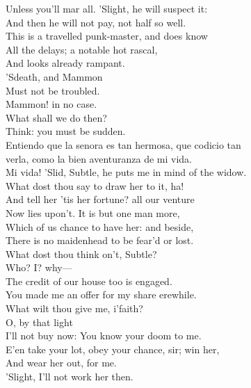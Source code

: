 \documentclass[a4paper,oneside]{memoir}
\begin{document}
\begin{drama*}
\facespeaks Unless you'll mar all. 'Slight, he will suspect it:\\
And then he will not pay, not half so well.\\
This is a travelled punk-master, and does know\\
All the delays; a notable hot rascal,\\
And looks already rampant.\\
\subtlespeaks {} 'Sdeath, and Mammon\\
Must not be troubled.\\
\facespeaks {} Mammon! in no case.\\
\subtlespeaks What shall we do then?\\
\facespeaks {} Think: you must be sudden.\\
\surlyspeaks Entiendo que la senora es tan hermosa, que codicio tan\\
verla, como la bien aventuranza de mi vida.\\
\facespeaks Mi vida! 'Slid, Subtle, he puts me in mind of the widow.\\
What dost thou say to draw her to it, ha!\\
And tell her 'tis her fortune? all our venture\\
Now lies upon't. It is but one man more,\\
Which of us chance to have her: and beside,\\
There is no maidenhead to be fear'd or lost.\\
What dost thou think on't, Subtle?\\
\subtlespeaks {} Who? I? why---\\
\facespeaks The credit of our house too is engaged.\\
\subtlespeaks You made me an offer for my share erewhile.\\
What wilt thou give me, i'faith?\\
\facespeaks {} O, by that light\\
I'll not buy now: You know your doom to me.\\
E'en take your lot, obey your chance, sir; win her,\\
And wear her out, for me.\\
\subtlespeaks {} 'Slight, I'll not work her then.\\

\end{drama*}
\end{document}
